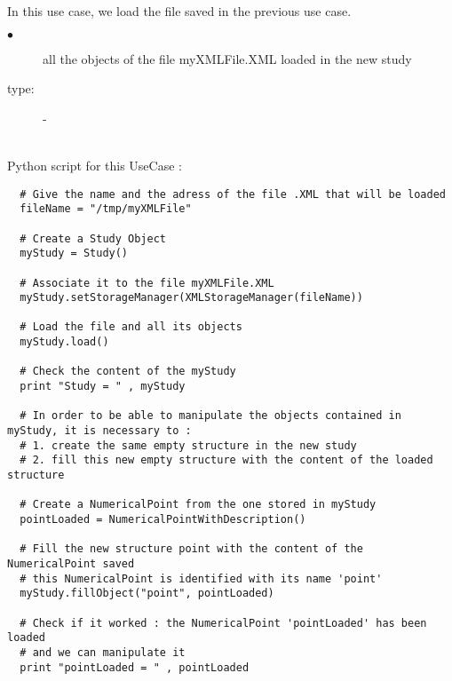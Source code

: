 In this use case, we load the file saved in the previous use case. \\

{
  \begin{description}
  \item[$\bullet$] all the objects of the file myXMLFile.XML loaded in the new study
  \item[type:] -
  \end{description}
}

\textspace\\
Python  script for this UseCase :

\begin{lstlisting}
  # Give the name and the adress of the file .XML that will be loaded
  fileName = "/tmp/myXMLFile"

  # Create a Study Object
  myStudy = Study()

  # Associate it to the file myXMLFile.XML
  myStudy.setStorageManager(XMLStorageManager(fileName))

  # Load the file and all its objects
  myStudy.load()

  # Check the content of the myStudy
  print "Study = " , myStudy

  # In order to be able to manipulate the objects contained in myStudy, it is necessary to :
  # 1. create the same empty structure in the new study
  # 2. fill this new empty structure with the content of the loaded structure

  # Create a NumericalPoint from the one stored in myStudy
  pointLoaded = NumericalPointWithDescription()

  # Fill the new structure point with the content of the NumericalPoint saved
  # this NumericalPoint is identified with its name 'point'
  myStudy.fillObject("point", pointLoaded)

  # Check if it worked : the NumericalPoint 'pointLoaded' has been loaded
  # and we can manipulate it
  print "pointLoaded = " , pointLoaded
\end{lstlisting}
